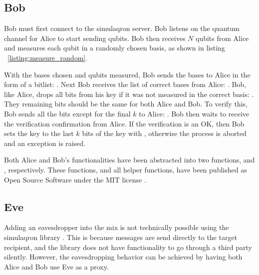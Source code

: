 \subsection{Bob}
Bob must first connect to the simulaqron server.
Bob listens on the quantum channel for Alice to start sending qubits.
Bob then receives $N$ qubits from Alice and measures each qubit in a randomly chosen basis, as shown in listing ~\ref{listing:measure_random}.
\begin{figure}[htp]
\noindent
\begin{minipage}{\linewidth}
\begin{singlespace}

\end{singlespace}
\end{minipage}
\end{figure}
With the bases chosen and qubits measured, Bob sends the bases to Alice in the form of a bitlist: .
Next Bob receives the list of correct bases from Alice: .
Bob, like Alice, drops all bits from his key if it was not measured in the correct basis: .
They remaining bits should be the same for both Alice and Bob. 
To verify this, Bob sends all the bits except for the final $k$ to Alice: .
Bob then waits to receive the verification confirmation from Alice.
If the verification is an OK, then Bob sets the key to the last $k$ bits of the key with , otherwise the process is aborted and an exception is raised.

Both Alice and Bob's functionalities have been abstracted into two functions,  and , respectively.
These functions, and all helper functions, have been published as  Open Source Software under the MIT license \cite{libbb84}.

\subsection{Eve}
Adding an eavesdropper into the mix is not technically possible using the simulaqron library \cite{simulaqron}.
This is because messages are send directly to the target recipient, and the library does not have functionality to go through a third party silently.
However, the eavesdropping behavior can be achieved by having both Alice and Bob use Eve as a proxy.

